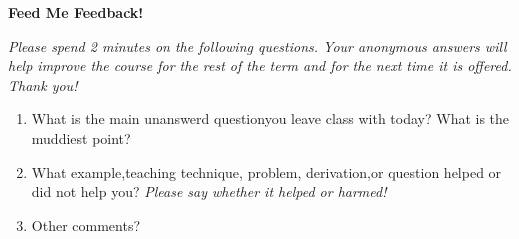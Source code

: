 \documentclass[12pt]{article}
\begin{document}
\thispagestyle{empty}
\begin{center}
{\LARGE \bf Feed Me Feedback!}
\end{center}

\vspace{5ex}


\vspace{5ex}

{\em Please spend 2 minutes on the following questions. Your anonymous answers will help improve the course for the rest of the term and for the next time it is offered. Thank you!}

\vspace{5ex}

\begin{enumerate}
\item What is the main unanswerd questionyou leave class with today? What is the muddiest point?

\vspace{2in}

\item What example,teaching technique, problem, derivation,or question helped or did not help you? {\em Please say whether it helped or harmed!}

\vspace{2in}

\item Other comments?

\vspace{2in}
\end{enumerate}
\end{document}
